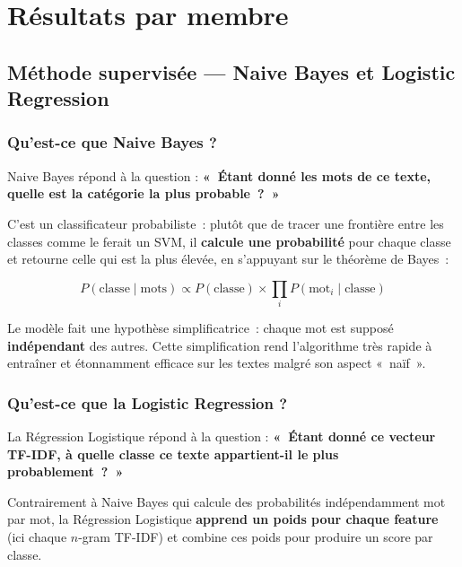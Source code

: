 \documentclass[12pt,a4paper]{article}
\begin{document}
\pagebreak

\section{Résultats par membre}

\subsection{Méthode supervisée --- Naive Bayes et Logistic Regression}

\subsubsection*{Qu'est-ce que Naive Bayes ?}

Naive Bayes répond à la question : \textbf{«~Étant donné les mots de ce texte, quelle est la catégorie la plus probable~?~»}

C'est un classificateur probabiliste~: plutôt que de tracer une frontière entre les classes comme le ferait un SVM, il \textbf{calcule une probabilité} pour chaque classe et retourne celle qui est la plus élevée, en s'appuyant sur le théorème de Bayes~:

\[
  P(\text{classe} \mid \text{mots}) \propto P(\text{classe}) \times \prod_i P(\text{mot}_i \mid \text{classe})
\]

Le modèle fait une hypothèse simplificatrice~: chaque mot est supposé \textbf{indépendant} des autres. Cette simplification rend l'algorithme très rapide à entraîner et étonnamment efficace sur les textes malgré son aspect «~naïf~».

\subsubsection*{Qu'est-ce que la Logistic Regression ?}

La Régression Logistique répond à la question : \textbf{«~Étant donné ce vecteur TF-IDF, à quelle classe ce texte appartient-il le plus probablement~?~»}

Contrairement à Naive Bayes qui calcule des probabilités indépendamment mot par mot, la Régression Logistique \textbf{apprend un poids pour chaque feature} (ici chaque $n$-gram TF-IDF) et combine ces poids pour produire un score par classe.
\end{document}
